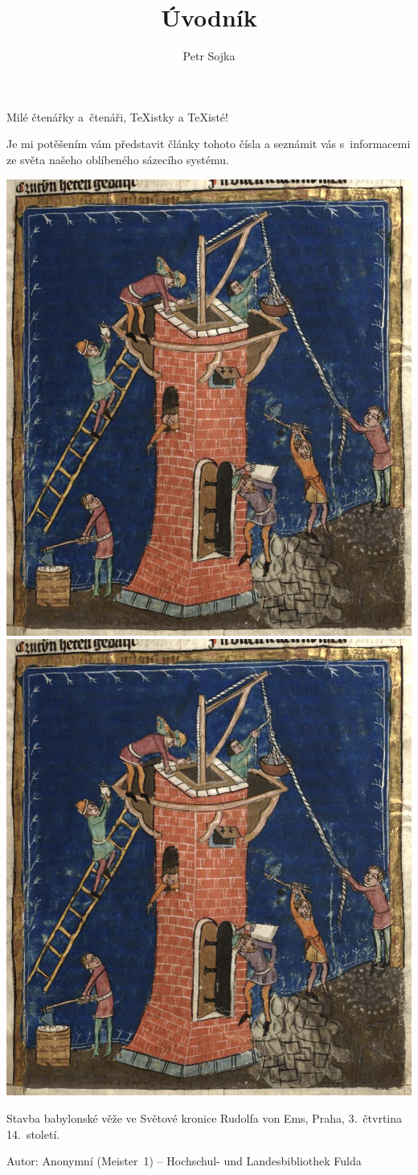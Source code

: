 \documentclass{csbulletin}
\begin{document}
\title{Úvodník}
\author{Petr Sojka}
\maketitle %

Milé čtenářky a~čtenáři, \TeX istky a \TeX isté!

Je mi potěšením vám představit články tohoto čísla a seznámit vás 
s~informacemi ze světa našeho oblíbeného sázecího systému.
\smallskip

\noindent
\makeatletter
\ifcsbul@web
\includegraphics[width=.6\textwidth]{Weltchronik_Fulda_Aa88_016r_detail-web}\hfill
\else
\includegraphics[width=.6\textwidth]{Weltchronik_Fulda_Aa88_016r_detail}\hfill
\fi
\makeatother
\begin{minipage}[b]{.37\textwidth}
Stavba babylonské věže ve Světové kronice Rudolfa von Ems, Praha, 3.~čtvrtina 14.~století.
\medskip

Autor: Anonymní (Meister~1) -- Hochschul- und Landes\-bibliothek Fulda
\end{minipage}
\smallskip
\end{document}
